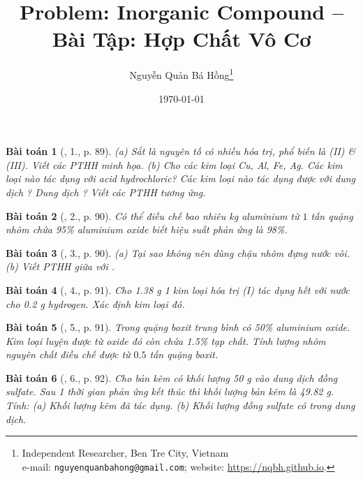 \documentclass{article}
\title{Problem: Inorganic Compound -- Bài Tập: Hợp Chất Vô Cơ}
\author{Nguyễn Quản Bá Hồng\footnote{Independent Researcher, Ben Tre City, Vietnam\\e-mail: \texttt{nguyenquanbahong@gmail.com}; website: \url{https://nqbh.github.io}.}}
\date{\today}
\newtheorem{baitoan}{Bài toán}
\begin{document}
\maketitle
\begin{abstract}
	
\end{abstract}
\setcounter{secnumdepth}{4}
\setcounter{tocdepth}{3}
\tableofcontents


\begin{baitoan}[\cite{An_Hoa_Hoc_nang_cao_8_9}, 1., p. 89]
	(a) Sắt là nguyên tố có nhiều hóa trị, phổ biến là (II) \& (III). Viết các {\rm PTHH} minh họa. (b) Cho các kim loại {\rm Cu, Al, Fe, Ag}. Các kim loại nào tác dụng với acid hydrochloric? Các kim loại nào tác dụng được với dung dịch {\rm{}}? Dung dịch {\rm{}}? Viết các {\rm PTHH} tương ứng.
\end{baitoan}

\begin{baitoan}[\cite{An_Hoa_Hoc_nang_cao_8_9}, 2., p. 90]
	Có thể điều chế bao nhiêu {\rm kg} aluminium từ $1$ tấn quặng nhôm chứa {\rm95\%} aluminium oxide biết hiệu suất phản ứng là {\rm98\%}.
\end{baitoan}

\begin{baitoan}[\cite{An_Hoa_Hoc_nang_cao_8_9}, 3., p. 90]
	(a) Tại sao không nên dùng chậu nhôm đựng nước vôi. (b) Viết PTHH giữa {\rm{}} với {\rm{}}.
\end{baitoan}

\begin{baitoan}[\cite{An_Hoa_Hoc_nang_cao_8_9}, 4., p. 91]
	Cho {\rm1.38 g} 1 kim loại hóa trị (I) tác dụng hết với nước cho {\rm0.2 g} hydrogen. Xác định kim loại đó.
\end{baitoan}

\begin{baitoan}[\cite{An_Hoa_Hoc_nang_cao_8_9}, 5., p. 91]
	Trong quặng boxit trung bình có {\rm50\%} aluminium oxide. Kim loại luyện được từ oxide đó còn chứa {\rm1.5\%} tạp chất. Tính lượng nhôm nguyên chất điều chế được từ $0.5$ tấn quặng boxit.
\end{baitoan}

\begin{baitoan}[\cite{An_Hoa_Hoc_nang_cao_8_9}, 6., p. 92]
	Cho bản kẽm có khối lượng {\rm50 g} vào dung dịch đồng sulfate. Sau 1 thời gian phản ứng kết thúc thì khối lượng bản kẽm là {\rm49.82 g}. Tính: (a) Khối lượng kẽm đã tác dụng. (b) Khối lượng đồng sulfate có trong dung dịch.
\end{baitoan}
\end{document}
